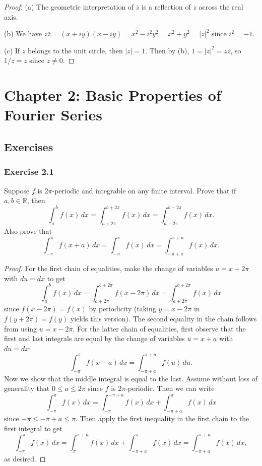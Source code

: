 \documentclass[letterpaper, 12pt]{article}
\newcommand{\R}{\mathbb{R}}
\begin{document}
\begin{proof}
  (a) The geometric interpretation of $\overline{z}$
  is a reflection of $z$ across the real axis.

  (b) We have
  $z \overline{z} = (x + iy)(x - iy) = x^2 - i^2 y^2
  = x^2 + y^2 = |z|^2$ since $i^2 = -1$.

  (c) If $z$ belongs to the unit circle, then
  $|z| = 1$. Then by (b),
  $1 = |z|^2 = z \overline{z}$, so
  $1 / z = \overline{z}$ since $z \ne 0$.
\end{proof}

\pagebreak
\section{Chapter 2: Basic Properties of Fourier Series}
\subsection{Exercises}
\subsubsection{Exercise 2.1}
\begin{tcolorbox}
  Suppose $f$ is $2\pi$-periodic and integrable on
  any finite interval. Prove that if $a, b \in \R$,
  then
  \[\int_a^b f(x)\, dx = \int_{a + 2\pi}^{b + 2\pi} f(x)\, dx = \int_{a - 2\pi}^{b - 2\pi} f(x)\, dx.\]
  Also prove that
  \[
    \int_{-\pi}^{\pi} f(x + a)\, dx
    = \int_{-\pi}^{\pi} f(x)\, dx
    = \int_{-\pi + a}^{\pi + a} f(x)\, dx.
  \]
\end{tcolorbox}

\begin{proof}
  For the first chain of equalities, make the
  change of variables $u = x + 2\pi$ with $du = dx$ to get
  \[
    \int_a^b f(x)\, dx = \int_{a + 2\pi}^{b + 2\pi} f(x - 2\pi)\, dx
    = \int_{a + 2\pi}^{b + 2\pi} f(x)\, dx
  \]
  since $f(x - 2\pi) = f(x)$ by periodicity (taking
  $y = x - 2\pi$ in $f(y + 2\pi) = f(y)$ yields this
  version).
  The second equality in the chain follows from
  using $u = x - 2\pi$. For the latter chain of
  equalities, first observe that the first and last
  integrals are equal by the change of variables
  $u = x + a$ with $du = dx$:
  \[
    \int_{-\pi}^{\pi} f(x + a)\, dx
    = \int_{-\pi + a}^{\pi + a} f(u)\, du.
  \]
  Now we show that the middle integral is equal to
  the last. Assume without loss of generality that
  $0 \le a \le 2\pi$ since $f$ is $2\pi$-periodic.
  Then we can write
  \[
    \int_{-\pi}^{\pi} f(x)\, dx
    = \int_{-\pi}^{-\pi + a} f(x)\, dx + \int_{-\pi + a}^{\pi} f(x)\, dx
  \]
  since $-\pi \le -\pi + a \le \pi$. Then apply
  the first inequality in the first chain to the
  first integral to get
  \[
    \int_{-\pi}^{\pi} f(x)\, dx
    = \int_{\pi}^{\pi + a} f(x)\, dx
    + \int_{-\pi + a}^{\pi} f(x)\, dx
    = \int_{-\pi + a}^{\pi + a} f(x)\, dx,
  \]
  as desired.
\end{proof}
\end{document}
